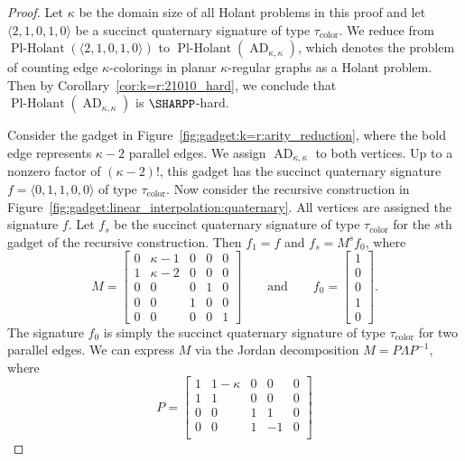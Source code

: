 \documentclass[11pt]{article}
\newcommand{\PlHolant}{\operatorname{Pl-Holant}}
\newcommand{\AD}{\operatorname{AD}}
\begin{document}
\begin{proof}
 Let $\kappa$ be the domain size of all Holant problems in this proof
 and let $\langle 2,1,0,1,0 \rangle$ be a succinct quaternary signature of type $\tau_\text{color}$.
 We reduce from $\PlHolant(\langle 2,1,0,1,0 \rangle)$ to $\PlHolant(\AD_{\kappa,\kappa})$,
 which denotes the problem of counting edge $\kappa$-colorings in planar $\kappa$-regular graphs as a Holant problem.
 Then by Corollary~\ref{cor:k=r:21010_hard},
 we conclude that $\PlHolant(\AD_{\kappa,\kappa})$ is $\SHARPP$-hard.

 Consider the gadget in Figure~\ref{fig:gadget:k=r:arity_reduction},
 where the bold edge represents $\kappa - 2$ parallel edges.
 We assign $\AD_{\kappa,\kappa}$ to both vertices.
 Up to a nonzero factor of $(\kappa-2)!$,
 this gadget has the succinct quaternary signature $f = \langle 0,1,1,0,0 \rangle$ of type $\tau_\text{color}$.
 Now consider the recursive construction in Figure~\ref{fig:gadget:linear_interpolation:quaternary}.
 All vertices are assigned the signature $f$.
 Let $f_s$ be the succinct quaternary signature of type $\tau_\text{color}$ for the $s$th gadget of the recursive construction.
 Then $f_1 = f$ and $f_s = M^s f_0$,
 where
 \[
  M =
  \begin{bmatrix}
   0 & \kappa - 1 & 0 & 0 & 0 \\
   1 & \kappa - 2 & 0 & 0 & 0 \\
   0 &          0 & 0 & 1 & 0 \\
   0 &          0 & 1 & 0 & 0 \\
   0 &          0 & 0 & 0 & 1
  \end{bmatrix}
  \qquad
  \text{and}
  \qquad
  f_0 =
  \begin{bmatrix}
   1 \\
   0 \\
   0 \\
   1 \\
   0
  \end{bmatrix}.
 \]
 The signature $f_0$ is simply the succinct quaternary signature of type $\tau_\text{color}$ for two parallel edges.
 We can express $M$ via the Jordan decomposition $M = P \Lambda P^{-1}$,
 where
 \[
  P =
  \begin{bmatrix}
   1 & 1 - \kappa & 0 &  0 & 0 \\
   1 &          1 & 0 &  0 & 0 \\
   0 &          0 & 1 &  1 & 0 \\
   0 &          0 & 1 & -1 & 0 \\

\end{bmatrix}\]
\end{proof}
\end{document}
